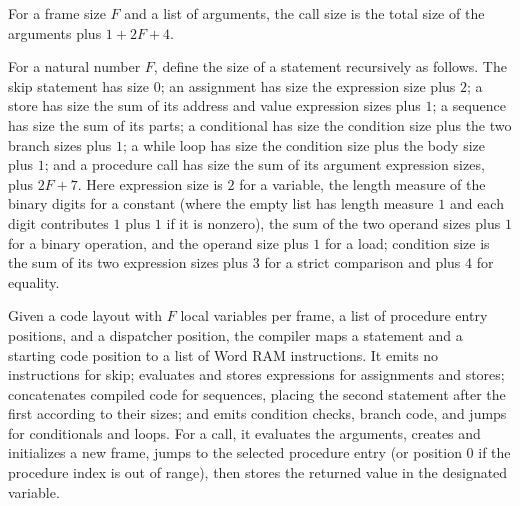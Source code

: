 \begin{definition}
\label{Light.Compiler.callSize}
\leanok
{}
For a frame size $F$ and a list of arguments, the call size is the total size of the
arguments plus $1+2F+4$.
\end{definition}

\begin{definition}
\label{Light.Stmt.size}
\leanok
{}
For a natural number $F$, define the size of a statement recursively as follows. The
skip statement has size $0$; an assignment has size the expression size plus $2$; a
store has size the sum of its address and value expression sizes plus $1$; a sequence
has size the sum of its parts; a conditional has size the condition size plus the two
branch sizes plus $1$; a while loop has size the condition size plus the body size plus
$1$; and a procedure call has size the sum of its argument expression sizes, plus
$2F+7$. Here expression size is $2$ for a variable, the length measure of the binary
digits for a constant (where the empty list has length measure $1$ and each digit
contributes $1$ plus $1$ if it is nonzero), the sum of the two operand sizes plus $1$
for a binary operation, and the operand size plus $1$ for a load; condition size is the
sum of its two expression sizes plus $3$ for a strict comparison and plus $4$ for
equality.
\end{definition}

\begin{definition}
\label{Light.Compiler.compileStmt}
\leanok
{}
Given a code layout with $F$ local variables per frame, a list of procedure entry
positions, and a dispatcher position, the compiler maps a statement and a starting code
position to a list of Word RAM instructions. It emits no instructions for skip;
evaluates and stores expressions for assignments and stores; concatenates compiled code
for sequences, placing the second statement after the first according to their sizes;
and emits condition checks, branch code, and jumps for conditionals and loops. For a
call, it evaluates the arguments, creates and initializes a new frame, jumps to the
selected procedure entry (or position $0$ if the procedure index is out of range), then
stores the returned value in the designated variable.
\end{definition}

